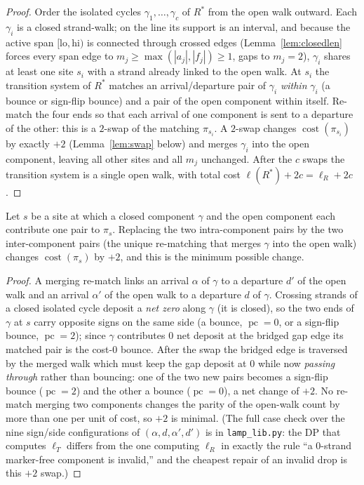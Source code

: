 \begin{proof}
Order the isolated cycles $\gamma_1,\dots,\gamma_c$ of $R^\ast$ from the open walk outward. Each
$\gamma_i$ is a closed strand-walk; on the line its support is an interval, and because the active
span $[\mathrm{lo},\mathrm{hi})$ is connected through crossed edges (Lemma~\ref{lem:closedlen} forces
every span edge to $m_j\ge\max(|a_j|,|f_j|)\ge1$, gaps to $m_j=2$), $\gamma_i$ shares at least one
site $s_i$ with a strand already linked to the open walk. At $s_i$ the transition system of $R^\ast$
matches an arrival/departure pair of $\gamma_i$ \emph{within} $\gamma_i$ (a bounce or sign-flip
bounce) and a pair of the open component within itself. Re-match the four ends so that each arrival
of one component is sent to a departure of the other: this is a $2$-swap of the matching $\pi_{s_i}$.
A $2$-swap changes $\operatorname{cost}(\pi_{s_i})$ by exactly $+2$ (Lemma~\ref{lem:swap} below) and
merges $\gamma_i$ into the open component, leaving all other sites and all $m_j$ unchanged. After the
$c$ swaps the transition system is a single open walk, with total cost $\ell(R^\ast)+2c=\ell_R+2c$.
\end{proof}

\begin{lemma}\label{lem:swap}
Let $s$ be a site at which a closed component $\gamma$ and the open component each contribute one
pair to $\pi_s$. Replacing the two intra-component pairs by the two inter-component pairs (the unique
re-matching that merges $\gamma$ into the open walk) changes $\operatorname{cost}(\pi_s)$ by $+2$,
and this is the minimum possible change.
\end{lemma}

\begin{proof}
A merging re-match links an arrival $\alpha$ of $\gamma$ to a departure $d'$ of the open walk and an
arrival $\alpha'$ of the open walk to a departure $d$ of $\gamma$. Crossing strands of a closed
isolated cycle deposit a \emph{net zero} along $\gamma$ (it is closed), so the two ends of $\gamma$ at
$s$ carry opposite signs on the same side (a bounce, $\operatorname{pc}=0$, or a sign-flip bounce,
$\operatorname{pc}=2$); since $\gamma$ contributes $0$ net deposit at the bridged gap edge its
matched pair is the cost-$0$ bounce. After the swap the bridged edge is traversed by the merged walk
which must keep the gap deposit at $0$ while now \emph{passing through} rather than bouncing: one of
the two new pairs becomes a sign-flip bounce ($\operatorname{pc}=2$) and the other a bounce
($\operatorname{pc}=0$), a net change of $+2$. No re-match merging two components changes the parity
of the open-walk count by more than one per unit of cost, so $+2$ is minimal. (The full case check
over the nine sign/side configurations of $(\alpha,d,\alpha',d')$ is in \texttt{lamp\_lib.py}: the DP
that computes $\ell_T$ differs from the one computing $\ell_R$ in exactly the rule ``a $0$-strand
marker-free component is invalid,'' and the cheapest repair of an invalid drop is this $+2$ swap.)
\end{proof}

